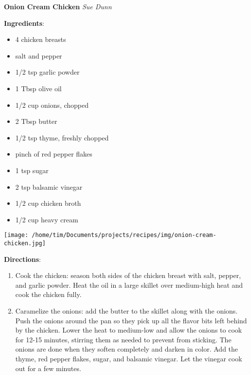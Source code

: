 \documentclass[11pt, twoside, openany]{book}
\begin{document}
\noindent\begin{minipage}[t]{\linewidth}%
{\Large\textbf{Onion Cream Chicken}} \label{onion-cream-chicken}\hfill\textit{Sue Dunn}\\
\noindent\begin{minipage}[t]{0.78\linewidth}%
\textbf{Ingredients}:\vspace{-3mm}
\begin{multicols}{2}
\begin{itemize}\setlength\itemsep{-1mm}
\item 4 chicken breasts
\item salt and pepper
\item 1/2 tsp garlic powder
\item 1 Tbsp olive oil
\item 1/2 cup onions, chopped
\item 2 Tbsp butter
\item 1/2 tsp thyme, freshly chopped
\item pinch of red pepper flakes
\item 1 tsp sugar
\item 2 tsp balsamic vinegar
\item 1/2 cup chicken broth
\item 1/2 cup heavy cream
\end{itemize}
\end{multicols}
\end{minipage}
\noindent\begin{minipage}[t]{0.18\linewidth}
\centering \strut\vspace*{-\baselineskip}\newline
\texttt{[image: /home/tim/Documents/projects/recipes/img/onion-cream-chicken.jpg]}\\
\end{minipage}\vspace{3mm}
\textbf{Directions}:
\vspace{-3mm}\begin{enumerate}\setlength\itemsep{-1mm}
\item Cook the chicken: season both sides of the chicken breast with salt, pepper, and garlic powder. Heat the oil in a large skillet over medium-high heat and cook the chicken fully.
\item Caramelize the onions: add the butter to the skillet along with the onions. Push the onions around the pan so they pick up all the flavor bits left behind by the chicken. Lower the heat to medium-low and allow the onions to cook for 12-15 minutes, stirring them as needed to prevent from sticking. The onions are done when they soften completely and darken in color. Add the thyme, red pepper flakes, sugar, and balsamic vinegar. Let the vinegar cook out for a few minutes.

\end{enumerate}
\end{minipage}
\end{document}
